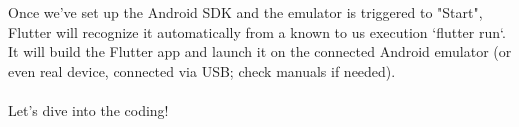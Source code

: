 

Once we've set up the Android SDK and the emulator is triggered to "Start", Flutter will recognize it automatically from
a known to us execution `flutter run`. It will build the Flutter app and launch it on the connected Android 
emulator (or even real device, connected via USB; check manuals if needed).
\\
\\
Let's dive into the coding!